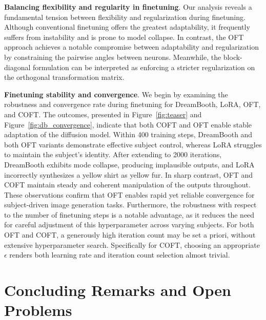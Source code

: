 \textbf{Balancing flexibility and regularity in finetuning}. Our analysis reveals a fundamental tension between flexibility and regularization during finetuning. Although conventional finetuning offers the greatest adaptability, it frequently suffers from instability and is prone to model collapse. In contrast, the OFT approach achieves a notable compromise between adaptability and regularization by constraining the pairwise angles between neurons. Meanwhile, the block-diagonal formulation can be interpreted as enforcing a stricter regularization on the orthogonal transformation matrix.

\textbf{Finetuning stability and convergence}. We begin by examining the robustness and convergence rate during finetuning for DreamBooth, LoRA, OFT, and COFT. The outcomes, presented in Figure~\ref{fig:teaser} and Figure~\ref{fig:db_convergence}, indicate that both COFT and OFT enable stable adaptation of the diffusion model. Within 400 training steps, DreamBooth and both OFT variants demonstrate effective subject control, whereas LoRA struggles to maintain the subject's identity. After extending to 2000 iterations, DreamBooth exhibits mode collapse, producing implausible outputs, and LoRA incorrectly synthesizes a yellow shirt as yellow fur. In sharp contrast, OFT and COFT maintain steady and coherent manipulation of the outputs throughout. These observations confirm that OFT enables rapid yet reliable convergence for subject-driven image generation tasks. Furthermore, the robustness with respect to the number of finetuning steps is a notable advantage, as it reduces the need for careful adjustment of this hyperparameter across varying subjects. For both OFT and COFT, a generously high iteration count may be set a priori, without extensive hyperparameter search. Specifically for COFT, choosing an appropriate $\epsilon$ renders both learning rate and iteration count selection almost trivial.

\section{Concluding Remarks and Open Problems}

